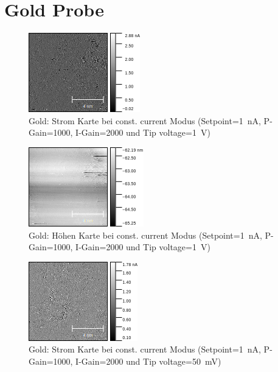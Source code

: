 \documentclass[sn-mathphys-num,iicol]{sn-jnl}
\theoremstyle{thmstyleone}
\theoremstyle{thmstyletwo}
\theoremstyle{thmstylethree}
\begin{document}
\section{Gold Probe}
\begin{figure}[t]
        \centering
        \includegraphics[width=.5\textwidth]{../data/Gold_10nm_current.png}
        \caption{Gold: Strom Karte bei const. current Modus (Setpoint=\SI{1}{\nano A}, P-Gain=\SI{1000}{}, I-Gain=\SI{2000}{} und Tip voltage=\SI{1}{V})} \label{fig:g10nmc}
\end{figure}
\begin{figure}[t]
        \centering
        \includegraphics[width=.5\textwidth]{../data/Gold_10nm_z.png}
        \caption{Gold: Höhen Karte bei const. current Modus (Setpoint=\SI{1}{\nano A}, P-Gain=\SI{1000}{}, I-Gain=\SI{2000}{} und Tip voltage=\SI{1}{V})} \label{fig:g10nmz}
\end{figure}
\begin{figure}[t]
        \centering
        \includegraphics[width=.5\textwidth]{../data/Gold_10nm_50mV_current.png}
        \caption{Gold: Strom Karte bei const. current Modus (Setpoint=\SI{1}{\nano A}, P-Gain=\SI{1000}{}, I-Gain=\SI{2000}{} und Tip voltage=\SI{50}{\milli V})} \label{fig:g10nm50mVc}
\end{figure}
\end{document}
